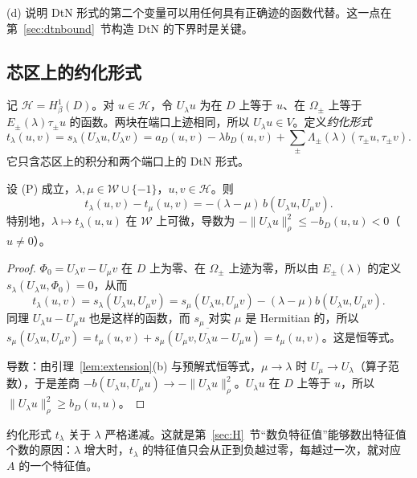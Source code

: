 \documentclass[11pt,a4paper,fontset=fandol]{ctexart}
\begin{document}
(d) 说明 DtN 形式的第二个变量可以用任何具有正确迹的函数代替。这一点在第~\ref{sec:dtnbound}~节构造 DtN 的下界时是关键。

\subsection{芯区上的约化形式}

记 $\mathcal H=H^1_\beta(D)$。对 $u\in\mathcal H$，令 $U_\lambda u$ 为在 $D$ 上等于 $u$、在 $\Omega_\pm$ 上等于 $E_\pm(\lambda)\tau_\pm u$ 的函数。两块在端口上迹相同，所以 $U_\lambda u\in V$。定义\emph{约化形式}
\begin{equation}
\label{eq:reduced}
t_\lambda(u,v)=s_\lambda(U_\lambda u,U_\lambda v)=a_D(u,v)-\lambda b_D(u,v)+\sum_\pm\Lambda_\pm(\lambda)(\tau_\pm u,\tau_\pm v).
\end{equation}
它只含芯区上的积分和两个端口上的 DtN 形式。

\begin{lemma}[约化形式的基本恒等式]
\label{lem:reduced-identity}
设 (P) 成立，$\lambda,\mu\in\mathcal W\cup\{-1\}$，$u,v\in\mathcal H$。则
\[
t_\lambda(u,v)-t_\mu(u,v)=-(\lambda-\mu)\,b(U_\lambda u,U_\mu v).
\]
特别地，$\lambda\mapsto t_\lambda(u,u)$ 在 $\mathcal W$ 上可微，导数为 $-\|U_\lambda u\|_\rho^2\le-b_D(u,u)<0$（$u\ne0$）。
\end{lemma}

\begin{proof}
$\Phi_0=U_\lambda v-U_\mu v$ 在 $D$ 上为零、在 $\Omega_\pm$ 上迹为零，所以由 $E_\pm(\lambda)$ 的定义 $s_\lambda(U_\lambda u,\Phi_0)=0$，从而
\[
t_\lambda(u,v)=s_\lambda(U_\lambda u,U_\mu v)=s_\mu(U_\lambda u,U_\mu v)-(\lambda-\mu)b(U_\lambda u,U_\mu v).
\]
同理 $U_\lambda u-U_\mu u$ 也是这样的函数，而 $s_\mu$ 对实 $\mu$ 是 Hermitian 的，所以
$s_\mu(U_\lambda u,U_\mu v)=t_\mu(u,v)+\overline{s_\mu(U_\mu v,U_\lambda u-U_\mu u)}=t_\mu(u,v)$。这是恒等式。

导数：由引理~\ref{lem:extension}(b) 与预解式恒等式，$\mu\to\lambda$ 时 $U_\mu\to U_\lambda$（算子范数），于是差商 $-b(U_\lambda u,U_\mu u)\to-\|U_\lambda u\|_\rho^2$。$U_\lambda u$ 在 $D$ 上等于 $u$，所以 $\|U_\lambda u\|_\rho^2\ge b_D(u,u)$。
\end{proof}

\begin{keypoint}
约化形式 $t_\lambda$ 关于 $\lambda$ 严格递减。这就是第~\ref{sec:H}~节“数负特征值”能够数出特征值个数的原因：$\lambda$ 增大时，$t_\lambda$ 的特征值只会从正到负越过零，每越过一次，就对应 $A$ 的一个特征值。
\end{keypoint}
\end{document}
